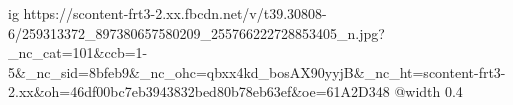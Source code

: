  
 
 
 
 

\ifcmt
  ig https://scontent-frt3-2.xx.fbcdn.net/v/t39.30808-6/259313372_897380657580209_255766222728853405_n.jpg?_nc_cat=101&ccb=1-5&_nc_sid=8bfeb9&_nc_ohc=qbxx4kd_bosAX90yyjB&_nc_ht=scontent-frt3-2.xx&oh=46df00bc7eb3943832bed80b78eb63ef&oe=61A2D348
  @width 0.4
\fi


